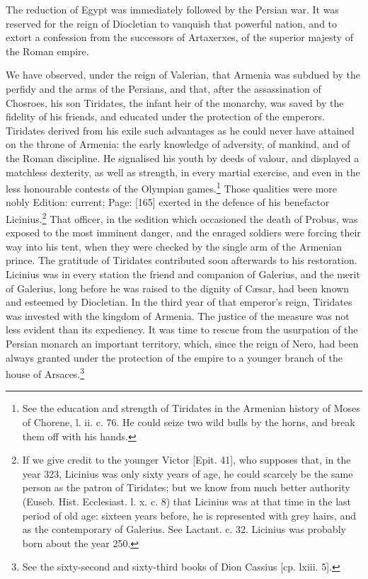 The reduction of Egypt was immediately followed by the Persian war. It was reserved for the reign of Diocletian to vanquish that powerful nation, and to extort a confession from the successors of Artaxerxes, of the superior majesty of the Roman empire.

We have observed, under the reign of Valerian, that Armenia was subdued by the perfidy and the arms of the Persians, and that, after the assassination of Chosroes, his son Tiridates, the infant heir of the monarchy, was saved by the fidelity of his friends, and educated under the protection of the emperors. Tiridates derived from his exile such advantages as he could never have attained on the throne of Armenia: the early knowledge of adversity, of mankind, and of the Roman discipline. He signalised his youth by deeds of valour, and displayed a matchless dexterity, as well as strength, in every martial exercise, and even in the less honourable contests of the Olympian games.\footnote{See the education and strength of Tiridates in the Armenian history of Moses of Chorene, l. ii. c. 76. He could seize two wild bulls by the horns, and break them off with his hands.} Those qualities were more nobly Edition: current; Page: [165] exerted in the defence of his benefactor Licinius.\footnote{If we give credit to the younger Victor [Epit. 41], who supposes that, in the year 323, Licinius was only sixty years of age, he could scarcely be the same person as the patron of Tiridates; but we know from much better authority (Euseb. Hist. Ecclesiast. l. x. c. 8) that Licinius was at that time in the last period of old age: sixteen years before, he is represented with grey hairs, and as the contemporary of Galerius. See Lactant. c. 32. Licinius was probably born about the year 250.} That officer, in the sedition which occasioned the death of Probus, was exposed to the most imminent danger, and the enraged soldiers were forcing their way into his tent, when they were checked by the single arm of the Armenian prince. The gratitude of Tiridates contributed soon afterwards to his restoration. Licinius was in every station the friend and companion of Galerius, and the merit of Galerius, long before he was raised to the dignity of Cæsar, had been known and esteemed by Diocletian. In the third year of that emperor\texthebrew{}’s reign, Tiridates was invested with the kingdom of Armenia. The justice of the measure was not less evident than its expediency. It was time to rescue from the usurpation of the Persian monarch an important territory, which, since the reign of Nero, had been always granted under the protection of the empire to a younger branch of the house of Arsaces.\footnote{See the sixty-second and sixty-third books of Dion Cassius [cp. lxiii. 5].}

